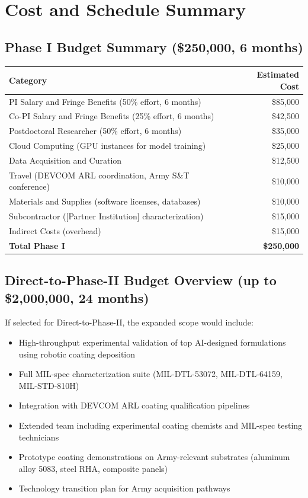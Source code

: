 \documentclass[11pt,letterpaper]{article}
\begin{document}
\section{Cost and Schedule Summary}
\label{sec:cost}

\subsection{Phase I Budget Summary (\$250,000, 6 months)}

\begin{center}
\begin{tabular}{lr}
\toprule
\textbf{Category} & \textbf{Estimated Cost} \\
\midrule
PI Salary and Fringe Benefits (50\% effort, 6 months) & \$85,000 \\
Co-PI Salary and Fringe Benefits (25\% effort, 6 months) & \$42,500 \\
Postdoctoral Researcher (50\% effort, 6 months) & \$35,000 \\
Cloud Computing (GPU instances for model training) & \$25,000 \\
Data Acquisition and Curation & \$12,500 \\
Travel (DEVCOM ARL coordination, Army S\&T conference) & \$10,000 \\
Materials and Supplies (software licenses, databases) & \$10,000 \\
Subcontractor ([Partner Institution] characterization) & \$15,000 \\
Indirect Costs (overhead) & \$15,000 \\
\midrule
\textbf{Total Phase I} & \textbf{\$250,000} \\
\bottomrule
\end{tabular}
\end{center}

\subsection{Direct-to-Phase-II Budget Overview (up to \$2,000,000, 24 months)}

If selected for Direct-to-Phase-II, the expanded scope would include:

\begin{itemize}[nosep]
  \item High-throughput experimental validation of top AI-designed formulations using robotic coating deposition
  \item Full MIL-spec characterization suite (MIL-DTL-53072, MIL-DTL-64159, MIL-STD-810H)
  \item Integration with DEVCOM ARL coating qualification pipelines
  \item Extended team including experimental coating chemists and MIL-spec testing technicians
  \item Prototype coating demonstrations on Army-relevant substrates (aluminum alloy 5083, steel RHA, composite panels)
  \item Technology transition plan for Army acquisition pathways
\end{itemize}
\end{document}
